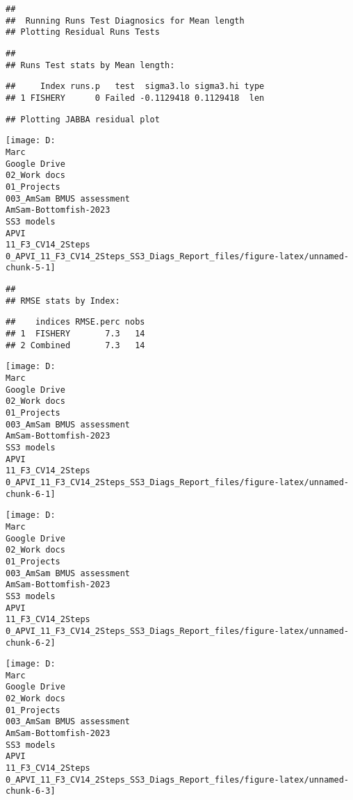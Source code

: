 \documentclass[
]{article}
\begin{document}
\begin{verbatim}
## 
##  Running Runs Test Diagnosics for Mean length 
## Plotting Residual Runs Tests
\end{verbatim}

\begin{verbatim}
## 
## Runs Test stats by Mean length:
\end{verbatim}

\begin{verbatim}
##     Index runs.p   test  sigma3.lo sigma3.hi type
## 1 FISHERY      0 Failed -0.1129418 0.1129418  len
\end{verbatim}

\begin{verbatim}
## Plotting JABBA residual plot
\end{verbatim}

\begin{center}\texttt{[image: D:\\Marc\\Google Drive\\02\_Work docs\\01\_Projects\\003\_AmSam BMUS assessment\\AmSam-Bottomfish-2023\\SS3 models\\APVI\\11\_F3\_CV14\_2Steps\\0\_APVI\_11\_F3\_CV14\_2Steps\_SS3\_Diags\_Report\_files/figure-latex/unnamed-chunk-5-1]} \end{center}

\begin{verbatim}
## 
## RMSE stats by Index:
\end{verbatim}

\begin{verbatim}
##    indices RMSE.perc nobs
## 1  FISHERY       7.3   14
## 2 Combined       7.3   14
\end{verbatim}

\begin{center}\texttt{[image: D:\\Marc\\Google Drive\\02\_Work docs\\01\_Projects\\003\_AmSam BMUS assessment\\AmSam-Bottomfish-2023\\SS3 models\\APVI\\11\_F3\_CV14\_2Steps\\0\_APVI\_11\_F3\_CV14\_2Steps\_SS3\_Diags\_Report\_files/figure-latex/unnamed-chunk-6-1]} \end{center}

\begin{center}\texttt{[image: D:\\Marc\\Google Drive\\02\_Work docs\\01\_Projects\\003\_AmSam BMUS assessment\\AmSam-Bottomfish-2023\\SS3 models\\APVI\\11\_F3\_CV14\_2Steps\\0\_APVI\_11\_F3\_CV14\_2Steps\_SS3\_Diags\_Report\_files/figure-latex/unnamed-chunk-6-2]} \end{center}

\begin{center}\texttt{[image: D:\\Marc\\Google Drive\\02\_Work docs\\01\_Projects\\003\_AmSam BMUS assessment\\AmSam-Bottomfish-2023\\SS3 models\\APVI\\11\_F3\_CV14\_2Steps\\0\_APVI\_11\_F3\_CV14\_2Steps\_SS3\_Diags\_Report\_files/figure-latex/unnamed-chunk-6-3]} \end{center}
\end{document}

